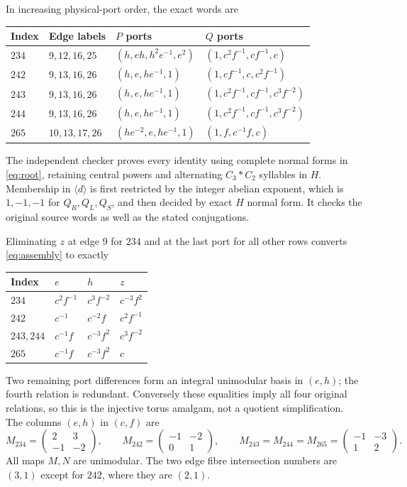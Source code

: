 \documentclass[11pt]{article}
\begin{document}
In increasing physical-port order, the exact words are
\begin{center}
\begin{tabular}{llll}
\toprule
Index & Edge labels & $P$ ports & $Q$ ports\\
\midrule
$234$ & $9,12,16,25$ & $(h,eh,h^2e^{-1},e^2)$ &
$(1,c^2f^{-1},cf^{-1},c)$\\[3pt]
$242$ & $9,13,16,26$ & $(h,e,he^{-1},1)$ &
$(1,cf^{-1},c,c^2f^{-1})$\\[3pt]
$243$ & $9,13,16,26$ & $(h,e,he^{-1},1)$ &
$(1,c^2f^{-1},cf^{-1},c^3f^{-2})$\\[3pt]
$244$ & $9,13,16,26$ & $(h,e,he^{-1},1)$ &
$(1,c^2f^{-1},cf^{-1},c^3f^{-2})$\\[3pt]
$265$ & $10,13,17,26$ & $(he^{-2},e,he^{-1},1)$ &
$(1,f,c^{-1}f,c)$\\
\bottomrule
\end{tabular}
\end{center}
The independent checker proves every identity using complete normal
forms in \eqref{eq:root}, retaining central powers and alternating
$C_3*C_2$ syllables in $H$. Membership in $\langle d\rangle$ is first
restricted by the integer abelian exponent, which is $1,-1,-1$ for
$Q_R,Q_L,Q_S$, and then decided by exact $H$ normal form. It checks
the original source words as well as the stated conjugations.

Eliminating $z$ at edge $9$ for $234$ and at the last port for all other
rows converts \eqref{eq:assembly} to exactly
\begin{center}
\begin{tabular}{llll}
\toprule
Index & $e$ & $h$ & $z$\\
\midrule
$234$ & $c^2f^{-1}$ & $c^3f^{-2}$ & $c^{-3}f^2$\\
$242$ & $c^{-1}$ & $c^{-2}f$ & $c^2f^{-1}$\\
$243,244$ & $c^{-1}f$ & $c^{-3}f^2$ & $c^3f^{-2}$\\
$265$ & $c^{-1}f$ & $c^{-3}f^2$ & $c$\\
\bottomrule
\end{tabular}
\end{center}
Two remaining port differences form an integral unimodular basis in
$(e,h)$; the fourth relation is redundant. Conversely these equalities
imply all four original relations, so this is the injective torus
amalgam, not a quotient simplification. The columns $(e,h)$ in $(c,f)$
are
\[
 M_{234}=\begin{pmatrix}2&3\\-1&-2\end{pmatrix},\qquad
 M_{242}=\begin{pmatrix}-1&-2\\0&1\end{pmatrix},\qquad
 M_{243}=M_{244}=M_{265}=\begin{pmatrix}-1&-3\\1&2\end{pmatrix}.
\]
All maps $M,N$ are unimodular. The two edge fibre intersection numbers
are $(3,1)$ except for $242$, where they are $(2,1)$.
\end{document}
